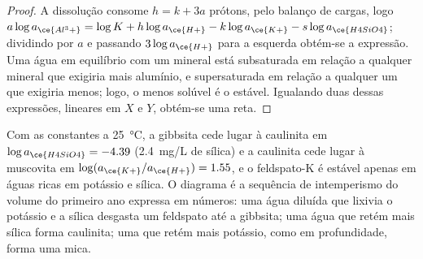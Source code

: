 \begin{proof}
A dissolução consome $h = k + 3a$ prótons, pelo balanço de cargas, logo $a\log
a_{\ce{Al^3+}} = \log K + h\log a_{\ce{H+}} - k\log a_{\ce{K+}} - s\log
a_{\ce{H4SiO4}}$; dividindo por $a$ e passando $3\log a_{\ce{H+}}$ para a esquerda
obtém-se a expressão. Uma água em equilíbrio com um mineral está
subsaturada em relação a qualquer mineral que exigiria mais alumínio, e
supersaturada em relação a qualquer um que exigiria menos; logo, o menos solúvel é
o estável. Igualando duas dessas expressões, lineares em $X$ e $Y$, obtém-se uma reta.
\end{proof}

Com as constantes a \qty{25}{\celsius}, a gibbsita cede lugar à caulinita em
$\log a_{\ce{H4SiO4}} = -4.39$ (\qty{2.4}{mg/L} de sílica) e a caulinita cede lugar à
muscovita em $\log(a_{\ce{K+}}/a_{\ce{H+}}) = 1.55$, e o feldspato-K é estável
apenas em águas ricas em potássio e sílica. O diagrama é a sequência de intemperismo
do volume do primeiro ano expressa em números: uma água diluída que lixivia
o potássio e a sílica desgasta um feldspato até a gibbsita; uma água que
retém mais sílica forma caulinita; uma que retém mais potássio, como em profundidade,
forma uma mica.

